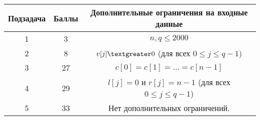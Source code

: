 \newcommand{\gt}{\textgreater} 
\newcommand{\lt}{\textless} 

\begin{center}
\renewcommand{\arraystretch}{1.5}
\begin{tabular}{|c|c|c|}
\hline
Подзадача & Баллы & Дополнительные ограничения на входные данные\\
\hline
1 & 3 & $n, q \leq 2000$ \\
\hline
2 & 8 & $v[j] \gt 0$ (для всех $0 \leq j \leq q-1$) \\
\hline
3 & 27 & $c[0] = c[1] = \ldots = c[n-1]$ \\
\hline
4 & 29 & $l[j] = 0$ и $r[j] = n-1$  (для всех $0 \leq j \leq q-1$) \\
\hline
5 & 33 & Нет дополнительных ограничений. \\
\hline
\end{tabular}
\end{center}